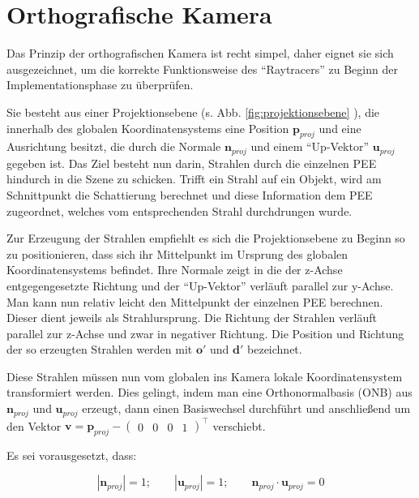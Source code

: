 \section{Orthografische Kamera}

Das Prinzip der orthografischen Kamera ist recht simpel, daher eignet sie sich ausgezeichnet, um die korrekte Funktionsweise des "`Raytracers"' zu Beginn der Implementationsphase zu überprüfen.

Sie besteht aus einer Projektionsebene (s. Abb. \ref{fig:projektionsebene} ), die innerhalb des globalen Koordinatensystems eine Position \( \boldsymbol{p}_{proj} \) und eine Ausrichtung besitzt, die durch die Normale \( \boldsymbol{n}_{proj} \) und einem "`Up-Vektor"' \( \boldsymbol{u}_{proj} \) gegeben ist. Das Ziel besteht nun darin, Strahlen durch die einzelnen PEE hindurch in die Szene zu schicken. Trifft ein Strahl auf ein Objekt, wird am Schnittpunkt die Schattierung berechnet und diese Information dem PEE zugeordnet, welches vom entsprechenden Strahl durchdrungen wurde. 

Zur Erzeugung der Strahlen empfiehlt es sich die Projektionsebene zu Beginn so zu positionieren, dass sich ihr Mittelpunkt im Ursprung des globalen Koordinatensystems befindet. 
Ihre Normale zeigt in die der z-Achse entgegengesetzte Richtung und der "`Up-Vektor"' verläuft parallel zur y-Achse. Man kann nun relativ leicht den Mittelpunkt der einzelnen PEE berechnen. Dieser dient jeweils als Strahlursprung. Die Richtung der Strahlen verläuft parallel zur z-Achse und zwar in negativer Richtung.
Die Position und Richtung der so erzeugten Strahlen werden mit \( \boldsymbol{o'} \) und \( \boldsymbol{d'} \) bezeichnet.

Diese Strahlen müssen nun vom globalen ins Kamera lokale Koordinatensystem transformiert werden. Dies gelingt, indem man eine Orthonormalbasis (ONB) aus \( \boldsymbol{n}_{proj} \) und \( \boldsymbol{u}_{proj} \) erzeugt, dann einen Basiswechsel durchführt und anschließend um den Vektor \( \boldsymbol{v} = \boldsymbol{p}_{proj} - \begin{pmatrix} 0 & 0 & 0 & 1 \end{pmatrix}^\intercal \) verschiebt.

Es sei vorausgesetzt, dass:

\begin{equation*}
|\boldsymbol{n}_{proj}| = 1; \qquad |\boldsymbol{u}_{proj}| = 1; \qquad \boldsymbol{n}_{proj} \cdot \boldsymbol{u}_{proj} = 0 
\end{equation*}

